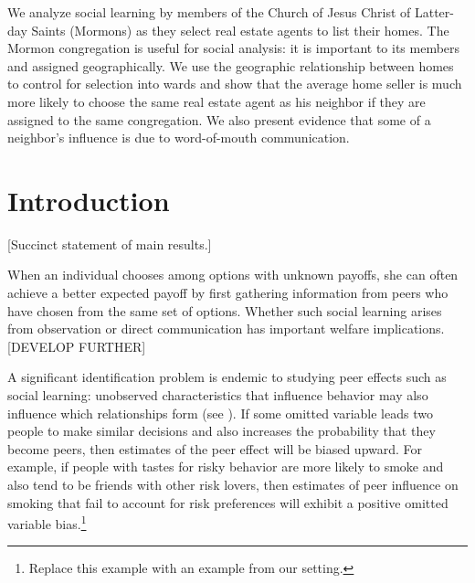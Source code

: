 \documentclass[12pt]{article}
\begin{document}
{\abstract
    We analyze social learning by members of the Church of Jesus Christ of Latter-day Saints (Mormons) as they select
    real estate agents to list their homes. The Mormon congregation is useful for social analysis: it is important to its members and assigned
    geographically. We use the geographic relationship between homes to control for selection into wards and show that the average home seller is much
    more likely to choose the same real estate agent as his neighbor if they are assigned to the same congregation. We also present evidence that some
    of a neighbor's influence is due to word-of-mouth communication.
}



\section{Introduction}
	[Succinct statement of main results.]

    When an individual chooses among options with unknown payoffs, she can often achieve a better expected payoff by first gathering information from peers who have chosen from the same set of options. Whether such social learning arises from observation or direct communication has important welfare implications. [DEVELOP FURTHER]
    
    A significant identification problem is endemic to studying peer effects such as social learning: unobserved characteristics that influence behavior may also influence which relationships
    form (see ). If some omitted variable leads two people to make similar
    decisions and also increases the probability that they become peers, then estimates of the peer effect will be biased upward. For example, if people with tastes for risky behavior are more likely to smoke and also tend to be friends with other risk lovers, then estimates of peer
    influence on smoking that fail to account for risk preferences will exhibit a positive omitted variable bias.\footnote{Replace this example with an example from our setting.}
\end{document}
